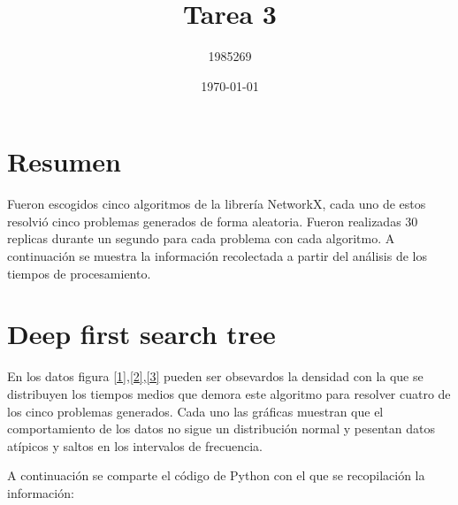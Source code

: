 \documentclass[a4paper, 11pt]{article}
\title{Tarea 3}
\date{\today}
\author{1985269}
\begin{document}
\maketitle


\section{Resumen}
Fueron escogidos cinco algoritmos de la librer\'ia NetworkX, cada uno de estos resolvi\'o cinco problemas generados de forma aleatoria. Fueron realizadas 30 replicas durante un segundo para cada problema con cada algoritmo. A continuaci\'on se muestra la informaci\'on recolectada a partir del an\'alisis de los tiempos de procesamiento. 


 

\section{Deep first search tree}
En los datos  figura \ref{1},\ref{2},\ref{3} pueden ser obsevardos la densidad con la que se distribuyen los tiempos medios que demora este algoritmo para resolver cuatro de los cinco problemas generados. Cada uno las gr\'aficas muestran que el comportamiento de los datos no sigue un distribuci\'on normal y pesentan datos at\'ipicos y saltos en los intervalos de frecuencia.

A continuaci\'on se comparte el c\'odigo de Python con el que se recopilaci\'on la informaci\'on:
\newpage

\end{document}
